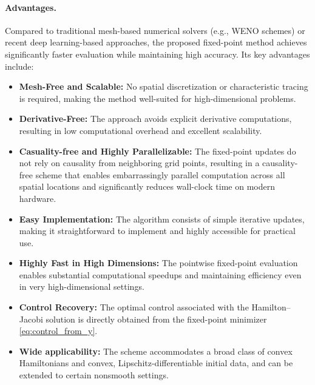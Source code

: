 \documentclass[review,hidelinks,onefignum,onetabnum]{siamart250106}
\begin{document}
\paragraph{Advantages.}
Compared to traditional mesh-based numerical solvers (e.g., WENO schemes) or recent deep learning-based approaches, the proposed fixed-point method achieves significantly faster evaluation while maintaining high accuracy. 
Its key advantages include:
\begin{itemize}
    \item \textbf{Mesh-Free and Scalable:} No spatial discretization or characteristic tracing is required, making the method well-suited for high-dimensional problems.
    \item \textbf{Derivative-Free:} The approach avoids explicit derivative computations, resulting in low computational overhead and excellent scalability.
    \item \textbf{Casuality-free and Highly Parallelizable:}
    The fixed-point updates do not rely on causality from neighboring grid points, resulting in a causality-free scheme that enables embarrassingly parallel computation across all spatial locations and significantly reduces wall-clock time on modern hardware.
    \item \textbf{Easy Implementation:} The algorithm consists of simple iterative updates, making it straightforward to implement and highly accessible for practical use.
    \item \textbf{Highly Fast in High Dimensions:} The pointwise fixed-point evaluation enables substantial computational speedups and maintaining efficiency even in very high-dimensional settings.
    \item \textbf{Control Recovery:} The optimal control associated with the Hamilton--Jacobi solution is directly obtained from the fixed-point minimizer \eqref{eq:control_from_y}.
    \item \textbf{Wide applicability:} The scheme accommodates a broad class of convex Hamiltonians and convex, Lipschitz-differentiable initial data, and can be extended to certain nonsmooth settings.
\end{itemize}

\end{document}
